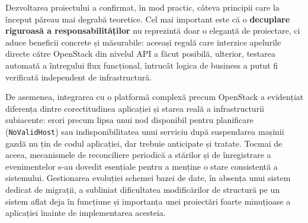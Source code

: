 Dezvoltarea proiectului a confirmat, în mod practic, câteva principii care la început păreau mai degrabă teoretice. Cel mai important este că o \textbf{decuplare riguroasă a responsabilităților} nu reprezintă doar o eleganță de proiectare, ci aduce beneficii concrete și măsurabile: aceeași regulă care interzice apelurile directe către OpenStack din nivelul API a făcut posibilă, ulterior, testarea automată a întregului flux funcțional, întrucât logica de business a putut fi verificată independent de infrastructură.

De asemenea, integrarea cu o platformă complexă precum OpenStack a evidențiat diferența dintre corectitudinea aplicației și starea reală a infrastructurii subiacente: erori precum lipsa unui nod disponibil pentru planificare (\texttt{NoValidHost}) sau indisponibilitatea unui serviciu după suspendarea mașinii gazdă nu țin de codul aplicației, dar trebuie anticipate și tratate. Tocmai de aceea, mecanismele de reconciliere periodică a stărilor și de înregistrare a evenimentelor s-au dovedit esențiale pentru a menține o stare consistentă a sistemului. Gestionarea evoluției schemei bazei de date, în absența unui sistem dedicat de migrații, a subliniat dificultatea modificărilor de structură pe un sistem aflat deja în funcțiune și importanța unei proiectări foarte minuțioase a aplicației înainte de implementarea acesteia.
